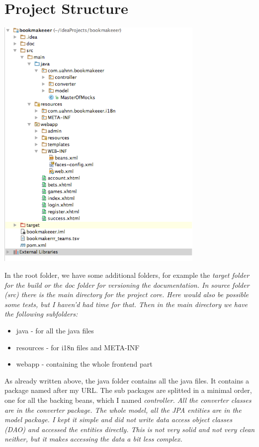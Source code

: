 \documentclass[11pt, halfparskip]{scrreprt}
\begin{document}
\chapter{Project Structure}
\includegraphics[width=10cm]{project-structure.png}

In the root folder, we have some additional folders, for example the \em{target} folder for the build or the doc folder for versioning the documentation. In source folder (\em{src}) there is the \em{main} directory for the project core. Here would also be possible some tests, but I haven'd had time for that. Then in the \em{main} directory we have the following subfolders:
\begin{itemize}
\item java - for all the java files
\item resources - for i18n files and META-INF
\item webapp - containing the whole frontend part
\end{itemize}

As already written above, the java folder contains all the java files. It contains a package named after my URL. The sub packages are splitted in a minimal order, one for all the backing beans, which I named \em{controller}. All the converter classes are in the \em{converter} package. The whole model, all the JPA entities are in the \em{model} package. I kept it simple and did not write data access object classes (DAO) and accessed the entities directly. This is not very solid and not very clean neither, but it makes accessing the data a bit less complex.
\end{document}
